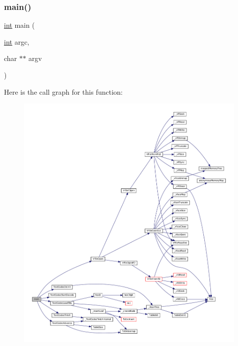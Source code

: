 \subsubsection{\texorpdfstring{main()}{main()}}
{\footnotesize\ttfamily \mbox{\hyperlink{ioapi_8h_a787fa3cf048117ba7123753c1e74fcd6}{int}} main (\begin{DoxyParamCaption}\item[{\mbox{\hyperlink{ioapi_8h_a787fa3cf048117ba7123753c1e74fcd6}{int}}}]{argc,  }\item[{char $\ast$$\ast$}]{argv }\end{DoxyParamCaption})}

Here is the call graph for this function\+:
\nopagebreak
\begin{figure}[H]
\begin{center}
\leavevmode
\includegraphics[width=350pt]{tbl-fuzz-main_8c_a3c04138a5bfe5d72780bb7e82a18e627_cgraph}
\end{center}
\end{figure}

